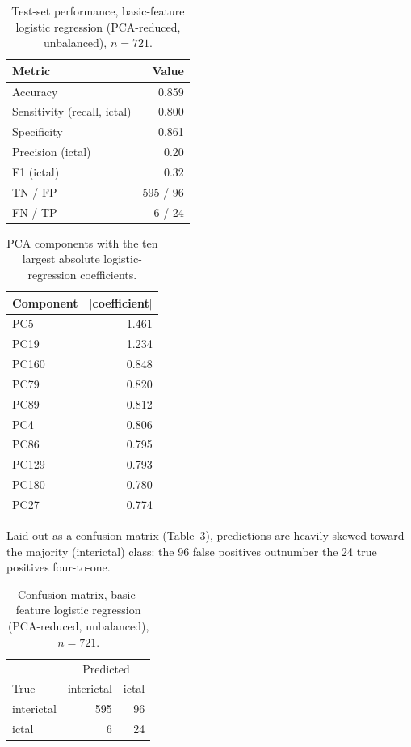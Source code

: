 ﻿\documentclass[a4paper,10pt]{article}
\begin{document}
\begin{table}[H]
\centering
\caption{Test-set performance, basic-feature logistic regression (PCA-reduced, unbalanced), $n=721$.}
\label{tab:cm_main}
\begin{tabular}{lr}
\toprule
Metric & Value \\
\midrule
Accuracy & 0.859 \\
Sensitivity (recall, ictal) & 0.800 \\
Specificity & 0.861 \\
Precision (ictal) & 0.20 \\
F1 (ictal) & 0.32 \\
TN / FP & 595 / 96 \\
FN / TP & 6 / 24 \\
\bottomrule
\end{tabular}
\end{table}

\begin{table}[H]
\centering
\caption{PCA components with the ten largest absolute logistic-regression coefficients.}
\label{tab:pcs}
\begin{tabular}{lr}
\toprule
Component & $|$coefficient$|$ \\
\midrule
PC5   & 1.461 \\
PC19  & 1.234 \\
PC160 & 0.848 \\
PC79  & 0.820 \\
PC89  & 0.812 \\
PC4   & 0.806 \\
PC86  & 0.795 \\
PC129 & 0.793 \\
PC180 & 0.780 \\
PC27  & 0.774 \\
\bottomrule
\end{tabular}
\end{table}

Laid out as a confusion matrix (Table~\ref{tab:cm2x2_unbal}), predictions are heavily skewed toward the majority (interictal) class: the 96 false positives outnumber the 24 true positives four-to-one.

\begin{table}[H]
\centering
\caption{Confusion matrix, basic-feature logistic regression (PCA-reduced, unbalanced), $n=721$.}
\label{tab:cm2x2_unbal}
\begin{tabular}{l rr}
\toprule
 & \multicolumn{2}{c}{Predicted} \\
True & interictal & ictal \\
\midrule
interictal & 595 & 96 \\
ictal      & 6   & 24 \\
\bottomrule
\end{tabular}
\end{table}
\end{document}
